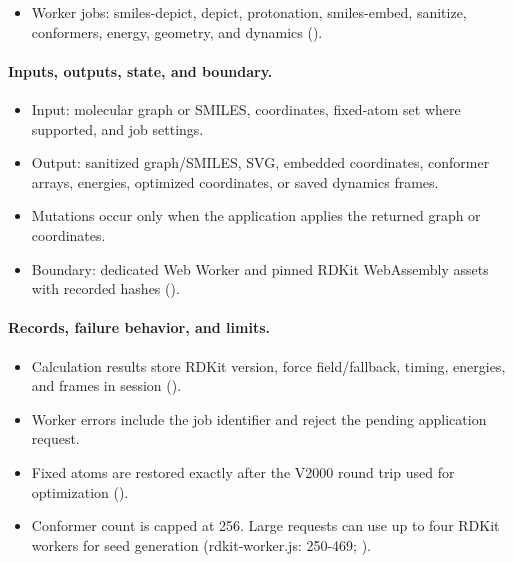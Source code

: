 \documentclass[11pt]{article}
\begin{document}
\begin{small}
\begin{itemize}[leftmargin=*]
\item Worker jobs: smiles-depict, depict, protonation, smiles-embed, sanitize, conformers, energy, geometry, and dynamics ().

\end{itemize}

\paragraph{Inputs, outputs, state, and boundary.}

\begin{itemize}[leftmargin=*]

\item Input: molecular graph or SMILES, coordinates, fixed-atom set where supported, and job settings.

\item Output: sanitized graph/SMILES, SVG, embedded coordinates, conformer arrays, energies, optimized coordinates, or saved dynamics frames.

\item Mutations occur only when the application applies the returned graph or coordinates.

\item Boundary: dedicated Web Worker and pinned RDKit WebAssembly assets with recorded hashes ().

\end{itemize}

\paragraph{Records, failure behavior, and limits.}

\begin{itemize}[leftmargin=*]

\item Calculation results store RDKit version, force field/fallback, timing, energies, and frames in session ().

\item Worker errors include the job identifier and reject the pending application request.

\item Fixed atoms are restored exactly after the V2000 round trip used for optimization ().

\item Conformer count is capped at 256. Large requests can use up to four RDKit workers for seed generation (rdkit-worker.js: 250-469; ).


\end{itemize}
\end{small}
\end{document}
